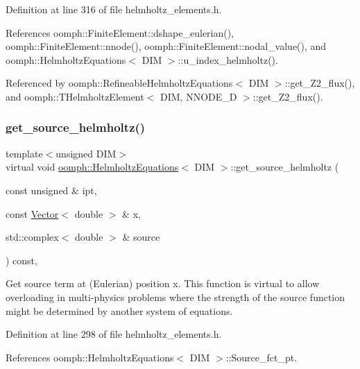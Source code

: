 Definition at line 316 of file helmholtz\+\_\+elements.\+h.



References oomph\+::\+Finite\+Element\+::dshape\+\_\+eulerian(), oomph\+::\+Finite\+Element\+::nnode(), oomph\+::\+Finite\+Element\+::nodal\+\_\+value(), and oomph\+::\+Helmholtz\+Equations$<$ D\+I\+M $>$\+::u\+\_\+index\+\_\+helmholtz().



Referenced by oomph\+::\+Refineable\+Helmholtz\+Equations$<$ D\+I\+M $>$\+::get\+\_\+\+Z2\+\_\+flux(), and oomph\+::\+T\+Helmholtz\+Element$<$ D\+I\+M, N\+N\+O\+D\+E\+\_\+D $>$\+::get\+\_\+\+Z2\+\_\+flux().

\mbox{\label{classoomph_1_1HelmholtzEquations_a6a65cb36cbb2d273a5cfe2a8f73e9604}} 
\subsubsection{\texorpdfstring{get\+\_\+source\+\_\+helmholtz()}{get\_source\_helmholtz()}}
{\footnotesize\ttfamily template$<$unsigned D\+IM$>$ \\
virtual void \hyperlink{classoomph_1_1HelmholtzEquations}{oomph\+::\+Helmholtz\+Equations}$<$ D\+IM $>$\+::get\+\_\+source\+\_\+helmholtz (\begin{DoxyParamCaption}\item[{const unsigned \&}]{ipt,  }\item[{const \hyperlink{classoomph_1_1Vector}{Vector}$<$ double $>$ \&}]{x,  }\item[{std\+::complex$<$ double $>$ \&}]{source }\end{DoxyParamCaption}) const\hspace{0.3cm}{\ttfamily [inline]}, {\ttfamily [virtual]}}

Get source term at (Eulerian) position x. This function is virtual to allow overloading in multi-\/physics problems where the strength of the source function might be determined by another system of equations. 

Definition at line 298 of file helmholtz\+\_\+elements.\+h.



References oomph\+::\+Helmholtz\+Equations$<$ D\+I\+M $>$\+::\+Source\+\_\+fct\+\_\+pt.

